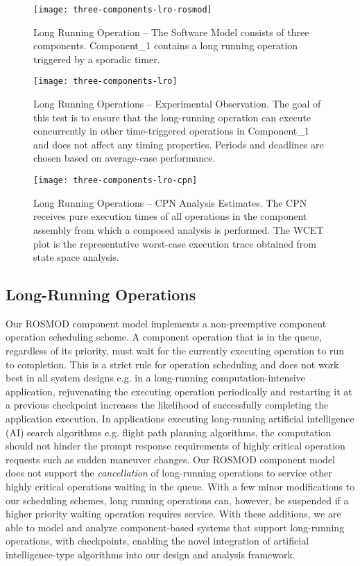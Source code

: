 \begin{figure}[h]
	\centering
	\texttt{[image: three-components-lro-rosmod]}
	\caption{Long Running Operation -- The Software Model consists of three components. Component\_1 contains a long running operation triggered by a sporadic timer.}
	\label{fig:three-components-lro-rosmod}
\end{figure}

\begin{figure*}[h]
	\centering
	\texttt{[image: three-components-lro]}
	\caption{Long Running Operations -- Experimental Observation. The goal of this test is to ensure that the long-running operation can execute concurrently in other time-triggered operations in Component\_1 and does not affect any timing properties. Periods and deadlines are chosen based on average-case performance.}
	\label{fig:three-components-lro}
\end{figure*}

\begin{figure*}[h]
	\centering
	\texttt{[image: three-components-lro-cpn]}
	\caption{Long Running Operations -- CPN Analysis Estimates. The CPN receives pure execution times of all operations in the component assembly from which a composed analysis is performed. The WCET plot is the representative worst-case execution trace obtained from state space analysis.}
	\label{fig:three-components-lro-cpn}
\end{figure*}

\subsection{Long-Running Operations}

Our ROSMOD component model implements a non-preemptive component operation scheduling scheme. A component operation that is in the queue, regardless of its priority, must wait for the currently executing operation to run to completion. This is a strict rule for operation scheduling and does not work best in all system designs e.g. in a long-running computation-intensive application, rejuvenating the executing operation periodically and restarting it at a previous checkpoint increases the likelihood of successfully completing the application execution. In applications executing long-running artificial intelligence (AI) search algorithms e.g. flight path planning algorithms, the computation should not hinder the prompt response requirements of highly critical operation requests such as sudden maneuver changes. Our ROSMOD component model does not support the \emph{cancellation} of long-running operations to service other highly critical operations waiting in the queue. With a few minor modifications to our scheduling schemes, long running operations can, however, be suspended if a higher priority waiting operation requires service. With these additions, we are able to model and analyze component-based systems that support long-running operations, with checkpoints, enabling the novel integration of artificial intelligence-type algorithms into our design and analysis framework. 

